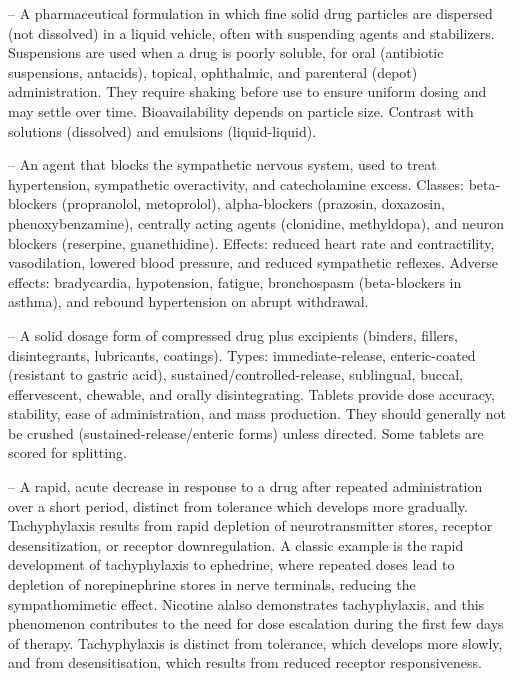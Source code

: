 -- A pharmaceutical formulation in which fine solid drug particles are dispersed (not dissolved) in a liquid vehicle, often with suspending agents and stabilizers. Suspensions are used when a drug is poorly soluble, for oral (antibiotic suspensions, antacids), topical, ophthalmic, and parenteral (depot) administration. They require shaking before use to ensure uniform dosing and may settle over time. Bioavailability depends on particle size. Contrast with solutions (dissolved) and emulsions (liquid-liquid).

-- An agent that blocks the sympathetic nervous system, used to treat hypertension, sympathetic overactivity, and catecholamine excess. Classes: beta-blockers (propranolol, metoprolol), alpha-blockers (prazosin, doxazosin, phenoxybenzamine), centrally acting agents (clonidine, methyldopa), and neuron blockers (reserpine, guanethidine). Effects: reduced heart rate and contractility, vasodilation, lowered blood pressure, and reduced sympathetic reflexes. Adverse effects: bradycardia, hypotension, fatigue, bronchospasm (beta-blockers in asthma), and rebound hypertension on abrupt withdrawal.

-- A solid dosage form of compressed drug plus excipients (binders, fillers, disintegrants, lubricants, coatings). Types: immediate-release, enteric-coated (resistant to gastric acid), sustained/controlled-release, sublingual, buccal, effervescent, chewable, and orally disintegrating. Tablets provide dose accuracy, stability, ease of administration, and mass production. They should generally not be crushed (sustained-release/enteric forms) unless directed. Some tablets are scored for splitting.

-- A rapid, acute decrease in response to a drug after repeated administration over a short period, distinct from tolerance which develops more gradually. Tachyphylaxis results from rapid depletion of neurotransmitter stores, receptor desensitization, or receptor downregulation. A classic example is the rapid development of tachyphylaxis to ephedrine, where repeated doses lead to depletion of norepinephrine stores in nerve terminals, reducing the sympathomimetic effect. Nicotine alalso demonstrates tachyphylaxis, and this phenomenon contributes to the need for dose escalation during the first few days of therapy. Tachyphylaxis is distinct from tolerance, which develops more slowly, and from desensitisation, which results from reduced receptor responsiveness.

